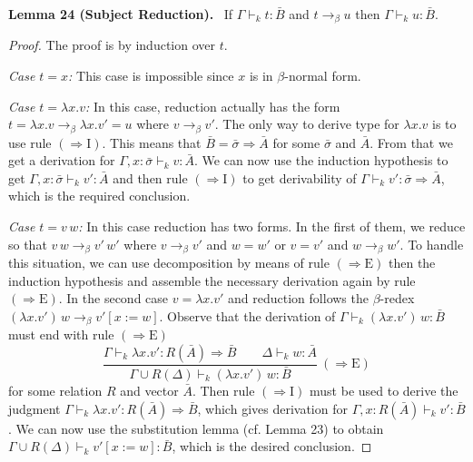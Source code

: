\documentclass[10pt,a4paper]{article}
\newcommand{\Av}{\bar A}\newcommand{\Bv}{\bar B}\newcommand{\Cv}{\bar C}
\newcommand{\sv}{\bar\sigma}\newcommand{\tv}{\bar\tau}
\newcommand{\pmjudgment}[3]{#1\vdash_k #2:#3}
\newcommand{\orig}[2]{\par\medskip\noindent\textbf{#1 #2.}\ }
\begin{document}
\orig{Lemma}{24 (Subject Reduction)} If $\pmjudgment\Gamma t\Bv$ and $t\to_\beta u$ then $\pmjudgment\Gamma u\Bv$.
\begin{proof}
The proof is by induction over $t$.\par
\emph{Case $t=x$:} This case is impossible since $x$ is in $\beta$-normal form.\par
\emph{Case $t=\lambda x.v$:} In this case, reduction actually has the form $t=\lambda x.v\to_\beta\lambda x.v'=u$ where $v\to_\beta v'$. The only way to derive type for $\lambda x.v$ is to use rule $(\Rightarrow\mathrm I)$. This means that $\Bv=\sv\Rightarrow\Av$ for some $\sv$ and $\Av$. From that we get a derivation for $\pmjudgment{\Gamma,x:\sv}v\Av$. We can now use the induction hypothesis to get $\pmjudgment{\Gamma,x:\sv}{v'}\Av$ and then rule $(\Rightarrow\mathrm I)$ to get derivability of $\pmjudgment\Gamma{v'}{\sv\Rightarrow\Av}$, which is the required conclusion.\par
\emph{Case $t=v\,w$:} In this case reduction has two forms. In the first of them, we reduce so that $v\,w\to_\beta v'\,w'$ where $v\to_\beta v'$ and $w=w'$ or $v=v'$ and $w\to_\beta w'$. To handle this situation, we can use decomposition by means of rule $(\Rightarrow\mathrm E)$ then the induction hypothesis and assemble the necessary derivation again by rule $(\Rightarrow\mathrm E)$.
In the second case $v=\lambda x.v'$ and reduction follows the $\beta$-redex $(\lambda x.v')\,w\to_\beta v'[x:=w]$. Observe that the derivation of $\pmjudgment\Gamma{(\lambda x.v')\,w}\Bv$ must end with rule $(\Rightarrow\mathrm E)$
\[\frac{\pmjudgment\Gamma{\lambda x.v'}{R(\Av)\Rightarrow\Bv}\qquad\pmjudgment\Delta w\Av}{\pmjudgment{\Gamma\cup R(\Delta)}{(\lambda x.v')\,w}\Bv}\ (\Rightarrow\mathrm E)\]
for some relation $R$ and vector $\Av$. Then rule $(\Rightarrow\mathrm I)$ must be used to derive the judgment $\pmjudgment\Gamma{\lambda x.v'}{R(\Av)\Rightarrow\Bv}$, which gives derivation for $\pmjudgment{\Gamma,x:R(\Av)}{v'}\Bv$. We can now use the substitution lemma (cf. Lemma 23) to obtain $\pmjudgment{\Gamma\cup R(\Delta)}{v'[x:=w]}\Bv$, which is the desired conclusion.
\end{proof}
\end{document}

